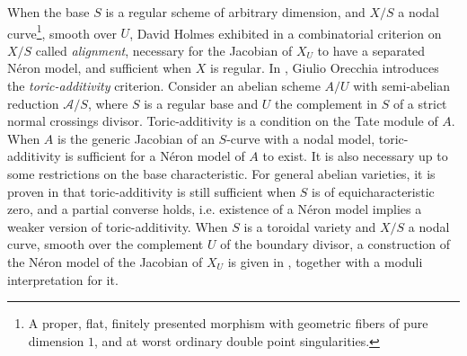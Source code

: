 \documentclass[a4paper,12pt]{amsart} %
\numberwithin{equation}{subsection}
\theoremstyle{definition}
\theoremstyle{plain}%
\theoremstyle{remark}
\begin{document}
When the base $S$ is a regular scheme of arbitrary dimension, and $X/S$ a nodal curve\footnote{A proper, flat, finitely presented morphism with geometric fibers of pure dimension $1$, and at worst ordinary double point singularities.}, smooth over $U$, David Holmes exhibited in \cite{Holmes} a combinatorial criterion on $X/S$ called \emph{alignment}, necessary for the Jacobian of $X_U$ to have a separated Néron model, and sufficient when $X$ is regular. In \cite{GiulioToricAdd}, Giulio Orecchia introduces the \emph{toric-additivity} criterion. Consider an abelian scheme $A/U$ with semi-abelian reduction $\mathcal{A}/S$, where $S$ is a regular base and $U$ the complement in $S$ of a strict normal crossings divisor. Toric-additivity is a condition on the Tate module of $A$. When $A$ is the generic Jacobian of an $S$-curve with a nodal model, toric-additivity is sufficient for a N\'eron model of $A$ to exist. It is also necessary up to some restrictions on the base characteristic. For general abelian varieties, it is proven in \cite{GiulioMonodromyCriterion} that toric-additivity is still sufficient when $S$ is of equicharacteristic zero, and a partial converse holds, i.e. existence of a N\'eron model implies a weaker version of toric-additivity. When $S$ is a toroidal variety and $X/S$ a nodal curve, smooth over the complement $U$ of the boundary divisor, a construction of the Néron model of the Jacobian of $X_U$ is given in \cite{HMOPModelsJacobians}, together with a moduli interpretation for it.

\end{document}
